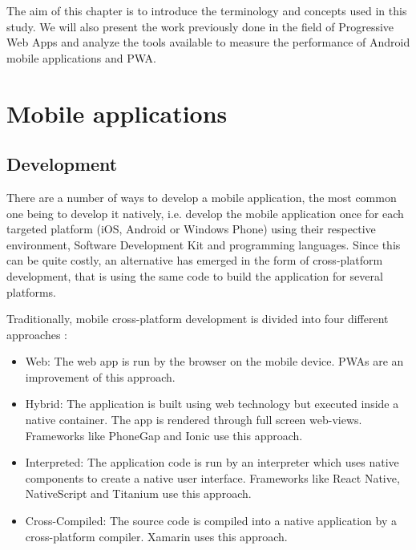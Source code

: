 \documentclass{kththesis}
\begin{document}

The aim of this chapter is to introduce the terminology and concepts used in this study. We will also present the work previously done in the field of Progressive Web Apps and analyze the tools available to measure the performance of Android mobile applications and PWA.

\section{Mobile applications}
\subsection{Development}
There are a number of ways to develop a mobile application, the most common one being to develop it natively, i.e. develop the mobile application once for each targeted platform (iOS, Android or Windows Phone) using their respective environment, Software Development Kit and programming languages. Since this can be quite costly, an alternative has emerged in the form of cross-platform development, that is using the same code to build the application for several platforms.

Traditionally, mobile cross-platform development is divided into four different approaches \cite{CrossPlatform_dev}:
\begin{itemize}
    \item Web: The web app is run by the browser on the mobile device. PWAs are an improvement of this approach.
    \item Hybrid: The application is built using web technology but executed inside a native container. The app is rendered through full screen web-views. Frameworks like PhoneGap and Ionic \cite{crossplatform_approaches} use this approach.
    \item Interpreted: The application code is run by an interpreter which uses native components to create a native user interface. Frameworks like React Native, NativeScript and Titanium \cite{emulating_native_w_crossplatform} use this approach.
    \item Cross-Compiled: The source code is compiled into a native application by a cross-platform compiler. Xamarin \cite{crossplatform_approaches} uses this approach. 
\end{itemize}
\end{document}
